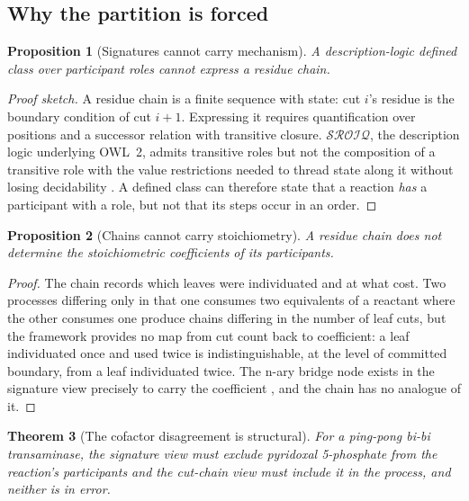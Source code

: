 \documentclass[11pt,twocolumn,a4paper]{article}
\theoremstyle{thmstyle}
\newtheorem{theorem}{Theorem}[section]
\newtheorem{proposition}[theorem]{Proposition}
\theoremstyle{definition}
\theoremstyle{remark}
\begin{document}
\subsection{Why the partition is forced}

\begin{proposition}[Signatures cannot carry mechanism]
\label{prop:sig-no-mech}
A description-logic defined class over participant roles cannot express a
residue chain.
\end{proposition}

\begin{proof}[Proof sketch]
A residue chain is a finite sequence with state: cut $i$'s residue is the
boundary condition of cut $i+1$. Expressing it requires quantification
over positions and a successor relation with transitive closure.
$\mathcal{SROIQ}$, the description logic underlying OWL~2, admits
transitive roles but not the composition of a transitive role with the
value restrictions needed to thread state along it without losing
decidability \citep{horrocks2006shoiq,baader2003dlhandbook}. A defined
class can therefore state that a reaction \emph{has} a participant with a
role, but not that its steps occur in an order.
\end{proof}

\begin{proposition}[Chains cannot carry stoichiometry]
\label{prop:chain-no-stoich}
A residue chain does not determine the stoichiometric coefficients of its
participants.
\end{proposition}

\begin{proof}
The chain records which leaves were individuated and at what cost. Two
processes differing only in that one consumes two equivalents of a
reactant where the other consumes one produce chains differing in the
number of leaf cuts, but the framework provides no map from cut count back
to coefficient: a leaf individuated once and used twice is
indistinguishable, at the level of committed boundary, from a leaf
individuated twice. The n-ary bridge node exists in the signature view
precisely to carry the coefficient \citep{w3c2006nary,demir2010biopax,
hucka2003sbml}, and the chain has no analogue of it.
\end{proof}

\begin{theorem}[The cofactor disagreement is structural]
\label{thm:cofactor}
For a ping-pong bi-bi transaminase, the signature view must exclude
pyridoxal 5\textquotesingle-phosphate from the reaction's participants and
the cut-chain view must include it in the process, and neither is in
error.
\end{theorem}
\end{document}
